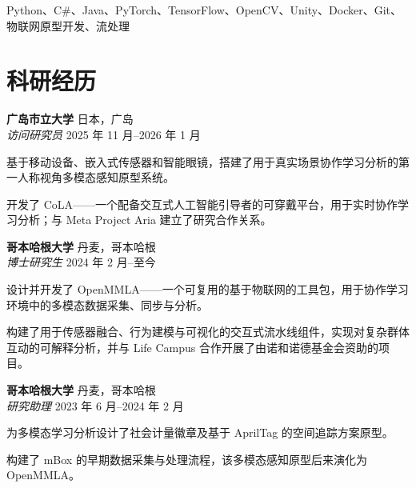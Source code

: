 \documentclass[11pt,letterpaper]{report}
\newcommand{\listitemspace}{0.25em}
\begin{document}
    Python、C\#、Java、PyTorch、TensorFlow、OpenCV、Unity、Docker、Git、物联网原型开发、流处理

    \section*{科研经历}

    \noindent \textbf{广岛市立大学} \hfill 日本，广岛 \\
    \textit{访问研究员} \hfill 2025 年 11 月--2026 年 1 月
    \begin{list}{\textbullet}{\setlength{\leftmargin}{1.2em}
                   \setlength{\labelsep}{0.5em}
                   \setlength{\itemsep}{\listitemspace}
                   \setlength{\parsep}{\listitemspace}}
        \item 基于移动设备、嵌入式传感器和智能眼镜，搭建了用于真实场景协作学习分析的第一人称视角多模态感知原型系统。
        \item 开发了 CoLA——一个配备交互式人工智能引导者的可穿戴平台，用于实时协作学习分析；与 Meta Project Aria 建立了研究合作关系。
    \end{list}
    \vspace{0.8em}

    \noindent \textbf{哥本哈根大学} \hfill 丹麦，哥本哈根 \\
    \textit{博士研究生} \hfill 2024 年 2 月--至今
    \begin{list}{\textbullet}{\setlength{\leftmargin}{1.2em}
                   \setlength{\labelsep}{0.5em}
                   \setlength{\itemsep}{\listitemspace}
                   \setlength{\parsep}{\listitemspace}}
        \item 设计并开发了 OpenMMLA——一个可复用的基于物联网的工具包，用于协作学习环境中的多模态数据采集、同步与分析。
        \item 构建了用于传感器融合、行为建模与可视化的交互式流水线组件，实现对复杂群体互动的可解释分析，并与 Life Campus 合作开展了由诺和诺德基金会资助的项目。
    \end{list}
    \vspace{0.8em}

    \noindent \textbf{哥本哈根大学} \hfill 丹麦，哥本哈根 \\
    \textit{研究助理} \hfill 2023 年 6 月--2024 年 2 月
    \begin{list}{\textbullet}{\setlength{\leftmargin}{1.2em}}
        \item 为多模态学习分析设计了社会计量徽章及基于 AprilTag 的空间追踪方案原型。
        \item 构建了 mBox 的早期数据采集与处理流程，该多模态感知原型后来演化为 OpenMMLA。
    \end{list}
\end{document}
